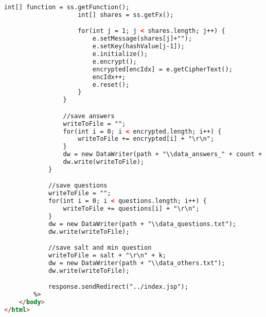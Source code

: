 \begin{lstlisting}[language=html,basicstyle=\tiny,caption=process.jsp]
                    int[] function = ss.getFunction();
                    int[] shares = ss.getFx();

                    for(int j = 1; j < shares.length; j++) {
                        e.setMessage(shares[j]+"");
                        e.setKey(hashValue[j-1]);
                        e.initialize();
                        e.encrypt();
                        encrypted[encIdx] = e.getCipherText();
                        encIdx++;
                        e.reset();
                    }
                }

                //save answers
                writeToFile = "";
                for(int i = 0; i < encrypted.length; i++) {
                    writeToFile += encrypted[i] + "\r\n";
                }
                dw = new DataWriter(path + "\\data_answers_" + count + ".txt");
                dw.write(writeToFile);
            }

            //save questions
            writeToFile = "";
            for(int i = 0; i < questions.length; i++) {
                writeToFile += questions[i] + "\r\n";
            }
            dw = new DataWriter(path + "\\data_questions.txt");
            dw.write(writeToFile);

            //save salt and min question
            writeToFile = salt + "\r\n" + k;
            dw = new DataWriter(path + "\\data_others.txt");
            dw.write(writeToFile);

            response.sendRedirect("../index.jsp");
        %>
    </body>
</html>

\end{lstlisting}

